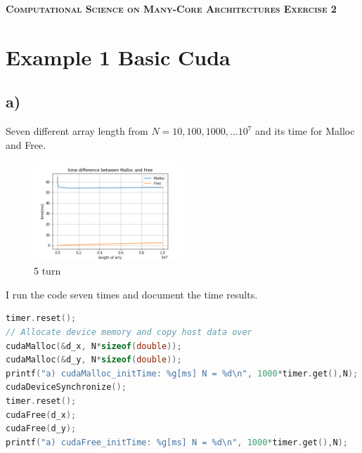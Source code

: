 \documentclass[11pt,a4paper]{article}
\begin{document}
\begin{center}
	\fontsize{24pt}{10pt}\selectfont
	\textsc{\textbf{Computational Science on Many-Core Architectures  Exercise 2}}
\end{center}
\section*{Example 1 Basic Cuda}
\subsection*{a)}
Seven different array length from $N = 10,100,1000,...10^7$ and its time for Malloc and Free.
\begin{figure}[H]
	\centering
	\includegraphics[width=0.50\textwidth]{Bilder/time_difference_between_Malloc_and_Free.png}
	\caption{5 turn}
\end{figure}
I run the code seven times and document the time results.
\begin{lstlisting}[language=C++, caption={code for a)}]
timer.reset();
// Allocate device memory and copy host data over
cudaMalloc(&d_x, N*sizeof(double)); 
cudaMalloc(&d_y, N*sizeof(double));
printf("a) cudaMalloc_initTime: %g[ms] N = %d\n", 1000*timer.get(),N);
cudaDeviceSynchronize();
timer.reset();
cudaFree(d_x);
cudaFree(d_y);
printf("a) cudaFree_initTime: %g[ms] N = %d\n", 1000*timer.get(),N);
\end{lstlisting}
\end{document}

